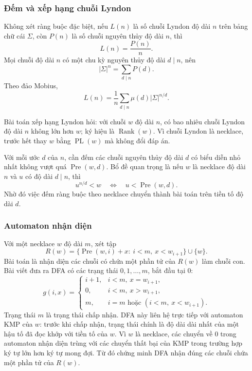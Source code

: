 \documentclass[11pt]{article}
\begin{document}
\subsubsection{Đếm và xếp hạng chuỗi Lyndon}

Không xét ràng buộc đặc biệt, nếu $L(n)$ là số chuỗi Lyndon độ dài $n$ trên bảng
chữ cái $\Sigma$, còn $P(n)$ là số chuỗi nguyên thủy độ dài $n$, thì
\[
  L(n)=\frac{P(n)}{n}.
\]
Mọi chuỗi độ dài $n$ có một chu kỳ nguyên thủy độ dài $d\mid n$, nên
\[
  |\Sigma|^n=\sum_{d\mid n} P(d).
\]
Theo đảo Mobius,
\[
  L(n)=\frac1n\sum_{d\mid n}\mu(d)|\Sigma|^{n/d}.
\]

Bài toán xếp hạng Lyndon hỏi: với chuỗi $w$ độ dài $n$, có bao nhiêu chuỗi
Lyndon độ dài $n$ không lớn hơn $w$; ký hiệu là $\operatorname{Rank}(w)$. Vì
chuỗi Lyndon là necklace, trước hết thay $w$ bằng $\operatorname{PL}(w)$ mà không
đổi đáp án.

Với mỗi ước $d$ của $n$, cần đếm các chuỗi nguyên thủy độ dài $d$ có biểu diễn
nhỏ nhất không vượt quá $\operatorname{Pre}(w,d)$. Bổ đề quan trọng là nếu $w$
là necklace độ dài $n$ và $u$ có độ dài $d\mid n$, thì
\[
  u^{n/d}<w \quad\Longleftrightarrow\quad
  u<\operatorname{Pre}(w,d).
\]
Nhờ đó việc đếm ràng buộc theo necklace chuyển thành bài toán trên tiền tố độ
dài $d$.

\subsubsection{Automaton nhận diện}

Với một necklace $w$ độ dài $m$, xét tập
\[
  R(w)=\{\operatorname{Pre}(w,i)+x:\ i<m,\ x<w_{i+1}\}\cup\{w\}.
\]
Bài toán là nhận diện các chuỗi có chứa một phần tử của $R(w)$ làm chuỗi con.
Bài viết đưa ra DFA có các trạng thái $0,1,\ldots,m$, bắt đầu tại $0$:
\[
  g(i,x)=
  \begin{cases}
    i+1, & i<m,\ x=w_{i+1},\\
    0, & i<m,\ x>w_{i+1},\\
    m, & i=m\text{ hoặc }(i<m,\ x<w_{i+1}).
  \end{cases}
\]
Trạng thái $m$ là trạng thái chấp nhận. DFA này liên hệ trực tiếp với automaton
KMP của $w$: trước khi chấp nhận, trạng thái chính là độ dài dài nhất của một
hậu tố đã đọc khớp với tiền tố của $w$. Vì $w$ là necklace, các chuyển về $0$
trong automaton nhận diện trùng với các chuyển thất bại của KMP trong trường hợp
ký tự lớn hơn ký tự mong đợi. Từ đó chứng minh DFA nhận đúng các chuỗi chứa một
phần tử của $R(w)$.
\end{document}
